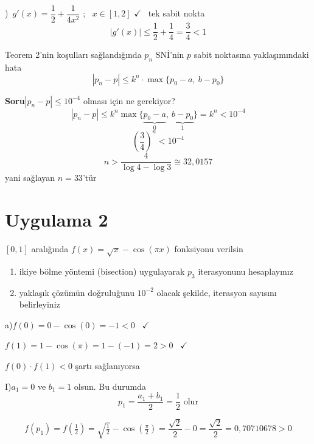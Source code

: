 \documentclass[11pt,a4paper]{article}
\begin{document}
)\ $g'(x)=\dfrac12+\dfrac{1}{4x^2}$ ; \ $x\in[1,2]$ \hfill $\checkmark$ \ tek sabit nokta
\[ |g'(x)|\le\frac12+\frac14=\frac34<1 \]

\begin{ozet}[Sonuç!]
Teorem 2'nin koşulları sağlandığında $p_n$ SNİ'nin $p$ sabit noktasına yaklaşımındaki hata
\[ |p_n-p|\le k^n\cdot\max\{p_0-a,\ b-p_0\} \]
\end{ozet}

\textbf{Soru}\quad $|p_n-p|\le10^{-4}$ olması için ne gerekiyor?
\[
  |p_n-p|\le k^n\max\{\underbrace{p_0-a}_{0},\ \underbrace{b-p_0}_{1}\}=k^n<10^{-4}
\]
\[ \left(\frac34\right)^n<10^{-4} \]
\[ n>\frac{4}{\log4-\log3}\cong 32{,}0157 \]
yani sağlayan $n=33$'tür

\section{Uygulama 2}
\begin{ornek}[1]
$[0,1]$ aralığında $f(x)=\sqrt{x}-\cos(\pi x)$ fonksiyonu verilsin
\begin{enumerate}[label=\alph*)]
  \item ikiye bölme yöntemi (bisection) uygulayarak $p_3$ iterasyonunu hesaplayınız
  \item yaklaşık çözümün doğruluğunu $10^{-2}$ olacak şekilde, iterasyon sayısını belirleyiniz
\end{enumerate}
\end{ornek}

a)\quad $f(0)=0-\cos(0)=-1<0$ \ $\checkmark$

\hspace*{2.2em}$f(1)=1-\cos(\pi)=1-(-1)=2>0$ \ $\checkmark$

\hspace*{2.2em}$f(0)\cdot f(1)<0$ şartı sağlanıyorsa

I)\quad $a_1=0$ ve $b_1=1$ olsun. Bu durumda
\[ p_1=\frac{a_1+b_1}{2}=\frac12 \text{ olur} \]
\begin{center}
\end{center}
\[
  f(p_1)=f\!\left(\tfrac12\right)=\sqrt{\tfrac12}-\cos\!\left(\tfrac{\pi}{2}\right)=\frac{\sqrt2}{2}-0=\frac{\sqrt2}{2}=0{,}70710678>0
\]
\end{document}
